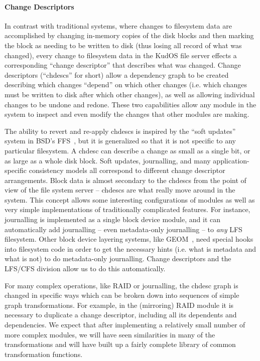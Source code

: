 \preparagraphspacing{}
\paragraph{Change Descriptors}
\label{sec:chdescs}

In contrast with traditional systems, where changes to filesystem data are
accomplished by changing in-memory copies of the disk blocks and then marking
the block as needing to be written to disk (thus losing all record of what was
changed), every change to filesystem data in the KudOS file server effects a
corresponding ``change descriptor'' that describes what was changed. Change
descriptors (``chdescs'' for short) allow a dependency graph to be created
describing which changes ``depend'' on which other changes (i.e. which changes
must be written to disk after which other changes), as well as allowing
individual changes to be undone and redone. These two capabilities allow any
module in the system to inspect and even modify the changes that other modules
are making.

The ability to revert and re-apply chdescs is inspired by the ``soft updates''
system in BSD's FFS~\cite{ganger00soft}, but it is generalized so that it is not
specific to any particular filesystem. A chdesc can describe a change as small
as a single bit, or as large as a whole disk block. Soft updates, journalling,
and many application-specific consistency models all correspond to different
change descriptor arrangements. Block data is almost secondary to the chdescs
from the point of view of the file system server -- chdescs are what really move
around in the system. This concept allows some interesting configurations of
modules as well as very simple implementations of traditionally complicated
features. For instance, journalling is implemented as a single block device
module, and it can automatically add journalling -- even metadata-only
journalling -- to {\it any} LFS filesystem. Other block device layering systems,
like GEOM~\cite{geom}, need special hooks into filesystem code in order to get
the necessary hints (i.e. what is metadata and what is not) to do metadata-only
journalling.   Change descriptors and the LFS/CFS
division allow us to do this automatically.

For many complex operations, like RAID or journalling, the chdesc graph is
changed in specific ways which can be broken down into sequences of simple graph
transformations. For example, in the (mirroring) RAID module it is necessary to
duplicate a change descriptor, including all its dependents and dependencies. We
expect that after implementing a relatively small number of more complex
modules, we will have seen similarities in many of the transformations and will
have built up a fairly complete library of common transformation functions.
